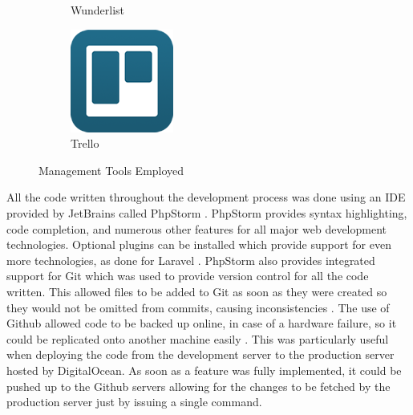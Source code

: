 \begin{figure}[H]
\begin{subfigure}[t]{0.15\linewidth}
		\caption{Wunderlist}\label{fig:Wunderlist}
	\end{subfigure}
    \quad
	\begin{subfigure}[t]{0.15\linewidth}
		\centering
		\includegraphics[width=\linewidth]{Images/Generic/Icons/Trello}
		\caption{Trello}\label{fig:Trello}
	\end{subfigure}
	\caption{Management Tools Employed}\label{fig:ManagementTools}
\end{figure}

All the code written throughout the development process was done using an IDE provided by JetBrains called PhpStorm \cite{JetBrains:PHPStorm}. PhpStorm provides syntax highlighting, code completion, and numerous other features for all major web development technologies. Optional plugins can be installed which provide support for even more technologies, as done for Laravel \cite{JetBrains:PHPStorm}. PhpStorm also provides integrated support for Git which was used to provide version control for all the code written. This allowed files to be added to Git as soon as they were created so they would not be omitted from commits, causing inconsistencies \cite{JetBrains:PHPStorm}. The use of Github allowed code to be backed up online, in case of a hardware failure, so it could be replicated onto another machine easily \cite{Github:Home}. This was particularly useful when deploying the code from the development server to the production server hosted by DigitalOcean\cite{DigitalOcean:Home}. As soon as a feature was fully implemented, it could be pushed up to the Github servers allowing for the changes to be fetched by the production server just by issuing a single command. 

